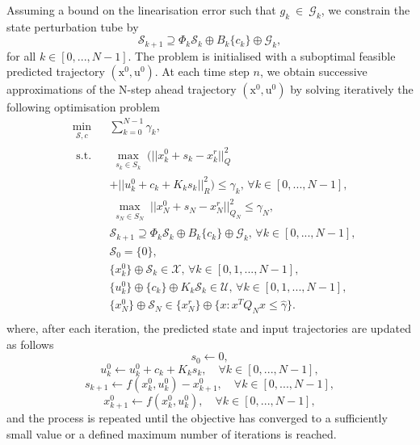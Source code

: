 \documentclass[letterpaper, 10 pt, conference]{ieeeconf}
\begin{document}
Assuming a bound on the linearisation error such that $g_k~\in~\mathcal{G}_k$, we constrain the state perturbation tube by 
\[
\mathcal{S}_{k+1} \supseteq \Phi_k \mathcal{S}_k \oplus B_k \{c_k\} \oplus \mathcal{G}_k, 
\] 
%
for all $k \in [0, ..., N-1]$. The problem is initialised with a suboptimal feasible predicted trajectory $(\bm{\mathrm{x}}^0, \bm{\mathrm{u}}^0)$. At each time step $n$, we obtain successive approximations of the N-step ahead trajectory $(\bm{\mathrm{x}}^0, \bm{\mathrm{u}}^0)$ by solving iteratively the following optimisation problem
%
\begin{equation}
\begin{aligned}
&  \min_{\substack{\mathcal{S}, c}} & &   \sum_{k = 0}^{N-1} \gamma_k,   \nonumber\\ 
&  \text{ s.t.} & & \max_{\substack{s_k \in S_k}} (|| x_k^0 + s_k - x_k^r ||_Q^2 \nonumber\\ &&& +  ||  u_k^0 + c_k + K_k s_k ||_R^2 ) \leq \gamma_k, \, \forall k \in [0,... , N-1],
\nonumber\\
& & &  \max_{\substack{s_N \in S_N}} || x_N^0 + s_N - x_N^r ||_{Q_N}^2 \leq \gamma_N, 
\nonumber\\
& & & \mathcal{S}_{k+1} \supseteq \Phi_k \mathcal{S}_k \oplus B_k \{c_k\} \oplus \mathcal{G}_k, \, \forall k \in [0,... , N-1],
\nonumber\\
& & &    \mathcal{S}_0 = \{0\}, 
\nonumber\\
& & &    \{x_k^0\} \oplus \mathcal{S}_k \in \mathcal{X}, \,  \forall k \in [0, 1,... , N-1], 
\nonumber\\
& & &    \{u_k^0\} \oplus \{c_k\} \oplus K_k \mathcal{S}_k \in \mathcal{U}, \, \forall k \in [0, 1,... , N-1], 
\nonumber\\
& & &   \{x_N^0\} \oplus \mathcal{S}_N \in \{x_N^r\} \oplus \{x: x^T Q_N x \leq \hat{\gamma}\}.
\nonumber\\
\end{aligned}
\end{equation}
%
where, after each iteration, the predicted state and input trajectories are updated as follows
\begin{equation}
\label{eq:iter1}
s_0 \longleftarrow 0,
\end{equation}
%
\begin{equation}
\label{eq:iter2}
u^0_k \longleftarrow u^0_k + c_k + K_k s_k, \quad \forall k \in [0, ... , N-1], 
\end{equation}
%
\begin{equation}
\label{eq:iter3}
s_{k+1} \longleftarrow f(x^0_k, u^0_k) - x^0_{k+1}, \quad \forall k \in [0,... , N-1],
\end{equation}
%
\begin{equation}
\label{eq:iter4}
x^0_{k+1} \longleftarrow f(x^0_k, u^0_k), \quad \forall k \in [0,... , N-1],
\end{equation}
and the process is repeated until the objective has converged to a sufficiently small value or a defined maximum number of iterations is reached. 
\end{document}
